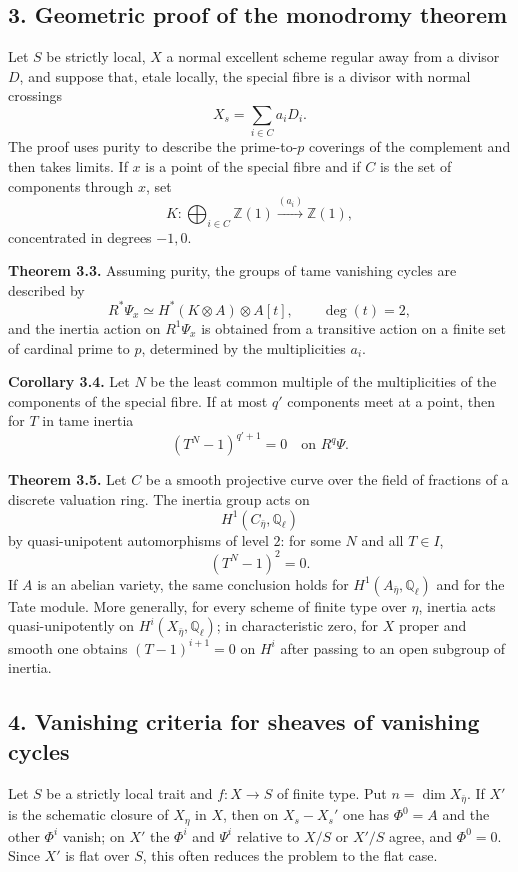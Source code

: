 \documentclass[11pt]{article}
\providecommand{\Z}{\mathbb Z}
\providecommand{\Ql}{\mathbb Q_\ell}
\begin{document}
\subsection*{3. Geometric proof of the monodromy theorem}
Let $S$ be strictly local, $X$ a normal excellent scheme regular away from a divisor $D$, and suppose that, etale locally, the special fibre is a divisor with normal crossings
\[
X_s=\sum_{i\in C} a_iD_i.
\]
The proof uses purity to describe the prime-to-$p$ coverings of the complement and then takes limits. If $x$ is a point of the special fibre and if $C$ is the set of components through $x$, set
\[
K: \bigoplus_{i\in C}\Z(1)\xrightarrow{(a_i)}\Z(1),
\]
concentrated in degrees $-1,0$.

\textbf{Theorem 3.3.} Assuming purity, the groups of tame vanishing cycles are described by
\[
 R^*\Psi_x \simeq H^*(K\otimes A)\otimes A[t],\qquad \deg(t)=2,
\]
and the inertia action on $R^1\Psi_x$ is obtained from a transitive action on a finite set of cardinal prime to $p$, determined by the multiplicities $a_i$.

\textbf{Corollary 3.4.} Let $N$ be the least common multiple of the multiplicities of the components of the special fibre. If at most $q'$ components meet at a point, then for $T$ in tame inertia
\[
 (T^N-1)^{q'+1}=0\quad\text{on }R^q\Psi.
\]

\textbf{Theorem 3.5.} Let $C$ be a smooth projective curve over the field of fractions of a discrete valuation ring. The inertia group acts on
\[
 H^1(C_{\bar\eta},\Ql)
\]
by quasi-unipotent automorphisms of level $2$: for some $N$ and all $T\in I$,
\[
 (T^N-1)^2=0.
\]
If $A$ is an abelian variety, the same conclusion holds for $H^1(A_{\bar\eta},\Ql)$ and for the Tate module. More generally, for every scheme of finite type over $\eta$, inertia acts quasi-unipotently on $H^i(X_{\bar\eta},\Ql)$; in characteristic zero, for $X$ proper and smooth one obtains $(T-1)^{i+1}=0$ on $H^i$ after passing to an open subgroup of inertia.

\subsection*{4. Vanishing criteria for sheaves of vanishing cycles}
Let $S$ be a strictly local trait and $f:X\to S$ of finite type. Put $n=\dim X_{\bar\eta}$. If $X'$ is the schematic closure of $X_\eta$ in $X$, then on $X_s-X_s'$ one has $\Phi^0=A$ and the other $\Phi^i$ vanish; on $X'$ the $\Phi^i$ and $\Psi^i$ relative to $X/S$ or $X'/S$ agree, and $\Phi^0=0$. Since $X'$ is flat over $S$, this often reduces the problem to the flat case.
\end{document}

